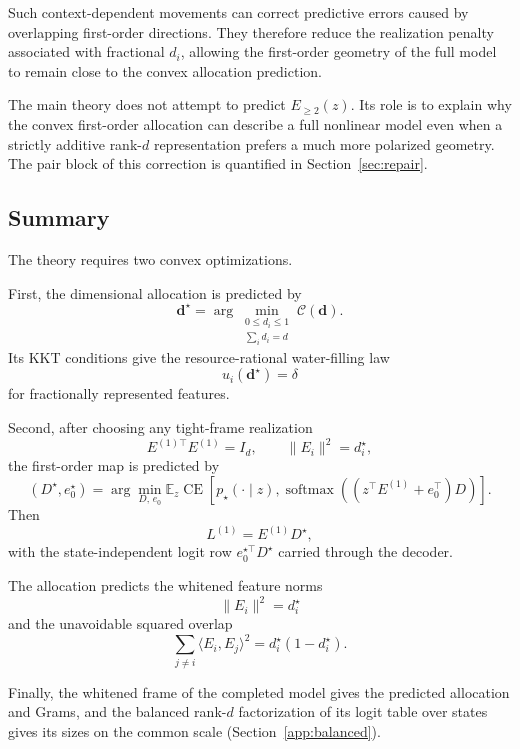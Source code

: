 Such context-dependent movements can correct predictive errors caused by overlapping
first-order directions. They therefore reduce the realization penalty associated
with fractional \(d_i\), allowing the first-order geometry of the full model to
remain close to the convex allocation prediction.

The main theory does not attempt to predict \(E_{\ge2}(z)\). Its role is to explain
why the convex first-order allocation can describe a full nonlinear model even when
a strictly additive rank-\(d\) representation prefers a much more polarized geometry.
The pair block of this correction is quantified in Section~\ref{sec:repair}.

\subsection{Summary}

The theory requires two convex optimizations.

First, the dimensional allocation is predicted by
\[
\boxed{
\mathbf d^\star
=
\arg\min_{\substack{0\le d_i\le1\\\sum_i d_i=d}}
\mathcal C(\mathbf d).
}
\]
Its KKT conditions give the resource-rational water-filling law
\[
u_i(\mathbf d^\star)=\delta
\]
for fractionally represented features.

Second, after choosing any tight-frame realization
\[
E^{(1)\top}E^{(1)}=I_d,
\qquad
\|E_i\|^2=d_i^\star,
\]
the first-order map is predicted by
\[
\boxed{
\left(D^\star,e_0^\star\right)
=
\arg\min_{D,\,e_0}
\mathbb E_z
\operatorname{CE}
\left[
p_\star(\cdot\mid z),
\operatorname{softmax}
\left(
\left(z^\top E^{(1)}+e_0^\top\right)D
\right)
\right].
}
\]
Then
\[
L^{(1)}=E^{(1)}D^\star,
\]
with the state-independent logit row \(e_0^{\star\top}D^\star\) carried through the
decoder.

The allocation predicts the whitened feature norms
\[
\|E_i\|^2=d_i^\star
\]
and the unavoidable squared overlap
\[
\sum_{j\neq i}\langle E_i,E_j\rangle^2
=
d_i^\star(1-d_i^\star).
\]

Finally, the whitened frame of the completed model gives the predicted allocation and
Grams, and the balanced rank-\(d\) factorization of its logit table over states gives
its sizes on the common scale (Section~\ref{app:balanced}).